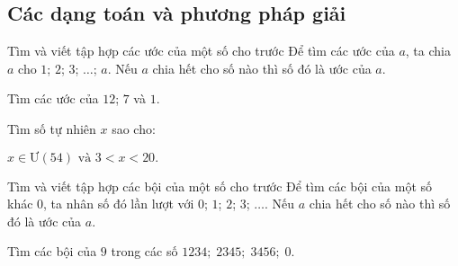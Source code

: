 \subsection{Các dạng toán và phương pháp giải}
\begin{dang}{Tìm và viết tập hợp các ước của một số cho trước}
	Để tìm các ước của $a$, ta chia $a$ cho $1$; $2$; $3$; $\ldots$; $a$. Nếu $a$ chia hết cho số nào thì số đó là ước của $a$.
	\end{dang}
\setcounter{vd}{0}
\begin{vd}%
	Tìm các ước của $12$; $7$ và $1$.
\end{vd}
\begin{vd}%
	Tìm số tự nhiên $x$ sao cho: \begin{center}
		$x\in\text{Ư}\left(54\right)\text{ và } 3<x<20.$
	\end{center}
\end{vd}
\begin{dang}{Tìm và viết tập hợp các bội của một số cho trước}
	Để tìm các bội của một số khác $0$, ta nhân số đó lần lượt với $0$; $1$; $2$; $3$; $\ldots$. Nếu $a$ chia hết cho số nào thì số đó là ước của $a$.
\end{dang}
\setcounter{vd}{0}
\begin{vd}%
	Tìm các bội của $9$ trong các số $1234;\; 2345;\; 3456;\; 0.$
\end{vd}
